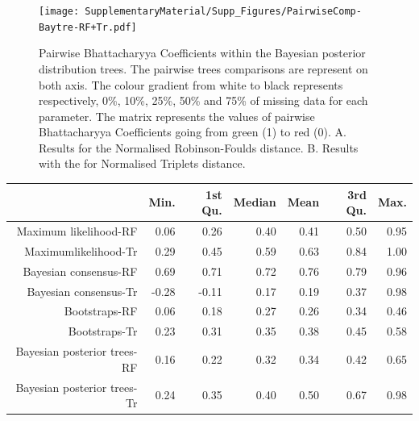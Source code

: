 \begin{figure} 
\centering
    \texttt{[image: SupplementaryMaterial/Supp\_Figures/PairwiseComp-Baytre-RF+Tr.pdf]}
\caption{Pairwise Bhattacharyya Coefficients within the Bayesian posterior distribution trees. The pairwise trees comparisons are represent on both axis. The colour gradient from white to black represents respectively, 0\%, 10\%, 25\%, 50\% and 75\% of missing data for each parameter. The matrix represents the values of pairwise Bhattacharyya Coefficients going from green (1) to red (0). A. Results for the Normalised Robinson-Foulds distance. B. Results with the for Normalised Triplets distance.}
\label{Fig_pairComp-MLbest-RF}
\end{figure} %


\begin{table}[ht]
\centering
\begin{tabular}{rrrrrrr}
  \hline
 & Min. & 1st Qu. & Median & Mean & 3rd Qu. & Max. \\ 
  \hline
  Maximum likelihood-RF & 0.06 & 0.26 & 0.40 & 0.41 & 0.50 & 0.95 \\ 
  Maximumlikelihood-Tr & 0.29 & 0.45 & 0.59 & 0.63 & 0.84 & 1.00 \\ 
  Bayesian consensus-RF & 0.69 & 0.71 & 0.72 & 0.76 & 0.79 & 0.96 \\ 
  Bayesian consensus-Tr & -0.28 & -0.11 & 0.17 & 0.19 & 0.37 & 0.98 \\ 
  Bootstraps-RF & 0.06 & 0.18 & 0.27 & 0.26 & 0.34 & 0.46 \\ 
  Bootstraps-Tr & 0.23 & 0.31 & 0.35 & 0.38 & 0.45 & 0.58 \\ 
  Bayesian posterior trees-RF & 0.16 & 0.22 & 0.32 & 0.34 & 0.42 & 0.65 \\ 
  Bayesian posterior trees-Tr & 0.24 & 0.35 & 0.40 & 0.50 & 0.67 & 0.98 \\ 
   \hline
   \hline
\end{tabular}
\end{table}

